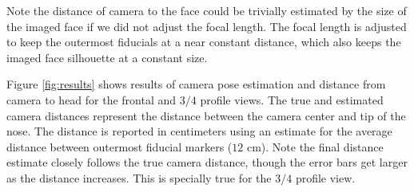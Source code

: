 \documentclass[runningheads]{llncs}
\begin{document}
Note the distance of camera to the face could be trivially estimated by the size of the imaged face if we did not adjust the focal length. 
The focal length is adjusted to keep the outermost fiducials at a near constant distance, which also keeps the imaged face silhouette at a constant size.

Figure \ref{fig:results} shows results of camera pose estimation and distance from camera to head for the frontal and $3/4$ profile views.  The true and estimated camera distances represent the distance between the camera center and tip of the nose.  The distance is reported in centimeters using an estimate for the average distance between outermost fiducial markers ($12$ cm). Note the final distance estimate closely follows the true camera distance, though the error bars get larger as the distance increases.  This is specially true for the $3/4$ profile view.   
\end{document}
